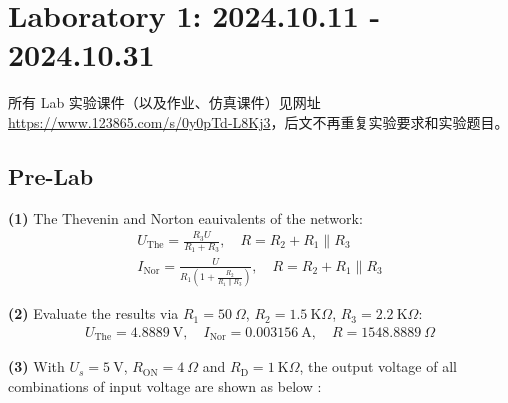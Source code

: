 \documentclass[UTF8]{report}
\def\kO{\ \mathrm{K}\Omega}
\def\KO{\ \mathrm{K}\Omega}
\theoremstyle{MyLineTheoremStyle} %
\theoremstyle{MyBlockTheoremStyle} %
\theoremstyle{MySubsubsectionStyle} %
\begin{document}
\chapter{Laboratory 1: 2024.10.11 - 2024.10.31}
\thispagestyle{fancy}

所有 Lab 实验课件（以及作业、仿真课件）见网址 \href{https://www.123865.com/s/0y0pTd-L8Kj3}{https://www.123865.com/s/0y0pTd-L8Kj3}，后文不再重复实验要求和实验题目。

\section{Pre-Lab}

\noindent \textbf{(1)}
The Thevenin and Norton eauivalents of the network:
\begin{gather}
U_{\text{The}} = \frac{R_3U}{R_1 + R_3},\quad R = R_2 + R_1 \parallel R_3 \\ 
I_{\text{Nor}} = \frac{U}{R_1 \left(1 + \frac{R_2}{R_1 \parallel R_3}\right)},\quad R = R_2 + R_1 \parallel R_3
\end{gather}

\noindent \textbf{(2)}
Evaluate the results via $R_1 = 50 \ \Omega$, $R_2 = 1.5 \kO$, $R_3 = 2.2 \kO$:
\begin{gather}
    U_{\text{The}} = 4.8889 \ \mathrm{V},\quad I_{\text{Nor}} = 0.003156 \ \mathrm{A},\quad  R = 1548.8889 \ \Omega
\end{gather}

\noindent \textbf{(3) }
With $U_s = 5 \ \mathrm{V}$, $R_{\text{ON}} = 4 \ \Omega$ and $R_{\text{D}} = 1 \KO$, the output voltage of all combinations of input voltage are shown as below : 
\end{document}
